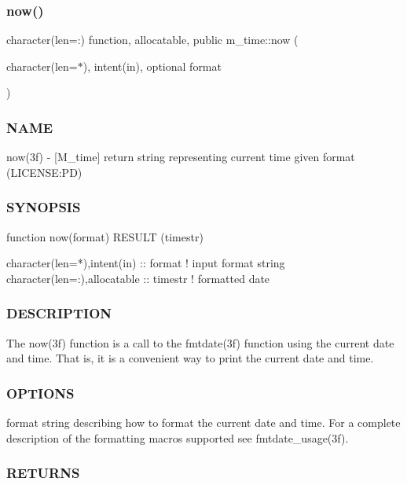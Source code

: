 \subsubsection{\texorpdfstring{now()}{now()}}
{\footnotesize\ttfamily character(len=\+:) function, allocatable, public m\+\_\+time\+::now (\begin{DoxyParamCaption}\item[{character(len=$\ast$), intent(in), optional}]{format }\end{DoxyParamCaption})}



\subsubsection*{N\+A\+ME}

now(3f) -\/ \mbox{[}M\+\_\+time\mbox{]} return string representing current time given format (L\+I\+C\+E\+N\+SE\+:PD) 

\subsubsection*{S\+Y\+N\+O\+P\+S\+IS}

\begin{DoxyVerb}function now(format) RESULT (timestr)

 character(len=*),intent(in)     :: format  ! input format string
 character(len=:),allocatable    :: timestr ! formatted date
\end{DoxyVerb}


\subsubsection*{D\+E\+S\+C\+R\+I\+P\+T\+I\+ON}

The now(3f) function is a call to the fmtdate(3f) function using the current date and time. That is, it is a convenient way to print the current date and time.

\subsubsection*{O\+P\+T\+I\+O\+NS}

format string describing how to format the current date and time. For a complete description of the formatting macros supported see fmtdate\+\_\+usage(3f). \subsubsection*{R\+E\+T\+U\+R\+NS}

